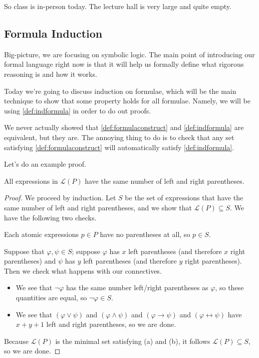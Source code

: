 \documentclass[../notes.tex]{subfiles}
\begin{document}

So class is in-person today. The lecture hall is very large and quite empty.

\subsection{Formula Induction}
Big-picture, we are focusing on symbolic logic. The main point of introducing our formal language right now is that it will help us formally define what rigorous reasoning is and how it works.

Today we're going to discuss induction on formulae, which will be the main technique to show that some property holds for all formulae. Namely, we will be using \autoref{def:indformula} in order to do out proofs.
\begin{remark}
	We never actually showed that \autoref{def:formulaconstruct} and \autoref{def:indformula} are equivalent, but they are. The annoying thing to do is to check that any set satisfying \autoref{def:formulaconstruct} will automatically satisfy \autoref{def:indformula}.
\end{remark}
Let's do an example proof.
\begin{proposition}
	All expressions in $\mathcal L(P)$ have the same number of left and right parentheses.
\end{proposition}
\begin{proof}
	We proceed by induction. Let $S$ be the set of expressions that have the same number of left and right parentheses, and we show that $\mathcal L(P)\subseteq S$. We have the following two checks.
	\begin{listalph}
		\item Each atomic expressions $p\in P$ have no parentheses at all, so $p\in S$.
		\item Suppose that $\varphi,\psi\in S$; suppose $\varphi$ has $x$ left parentheses (and therefore $x$ right parentheses) and $\psi$ has $y$ left parentheses (and therefore $y$ right parentheses). Then we check what happens with our connectives.
		\begin{itemize}
			\item We see that $\lnot\varphi$ has the same number left/right parentheses as $\varphi$, so these quantities are equal, so $\lnot\varphi\in S$.
			\item We see that $(\varphi\lor\psi)$ and $(\varphi\land\psi)$ and $(\varphi\to\psi)$ and $(\varphi\leftrightarrow\psi)$ have $x+y+1$ left and right parentheses, so we are done.
		\end{itemize}
	\end{listalph}
	Because $\mathcal L(P)$ is the minimal set satisfying (a) and (b), it follows $\mathcal L(P)\subseteq S$, so we are done.
\end{proof}
\end{document}
